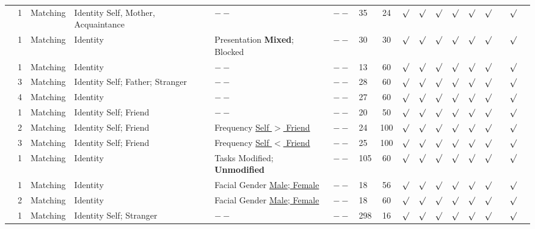 \documentclass[sn-apa]{sn-jnl}%
\theoremstyle{thmstyleone}%
\theoremstyle{thmstyletwo}%
\theoremstyle{thmstylethree}%
\begin{document}
\begin{table}
\begin{tabular*}{\textwidth}{@{\extracolsep\fill}lp{0.5cm}p{1cm}p{1cm}p{1cm}cp{1cm}cccccccccc}
		\textcite{schafer2019understanding} & 1 & Matching & Identity Self, Mother, Acquaintance\centering & $--$\centering & $--$ & 35 & 24 & $\surd$ & $\surd$ & $\surd$ & $\surd$  & $\surd$ & $\surd$ & & $\surd$ \\
		\textcite{golubickis2021judging} & 1 & Matching & Identity\centering & Presentation \textbf{Mixed}; Blocked\centering & $--$ & 30 & 30 & $\surd$ & $\surd$ & $\surd$ & $\surd$  & $\surd$ & $\surd$ & & $\surd$ \\
		 \textcite{navon2021are} & 1 & Matching & Identity\centering & $--$\centering & $--$ & 13 & 60 & $\surd$ & $\surd$ & $\surd$ & $\surd$  & $\surd$ & $\surd$ & & $\surd$ \\
		 & 3 & Matching & Identity Self; Father; Stranger\centering & $--$\centering & $--$ & 28 & 60 & $\surd$ & $\surd$ & $\surd$ & $\surd$  & $\surd$ & $\surd$ & & $\surd$ \\
		& 4 & Matching & Identity\centering & $--$\centering & $--$ & 27 & 60 & $\surd$ & $\surd$ & $\surd$ & $\surd$  & $\surd$ & $\surd$ & & $\surd$ \\
		\textcite{svensson2022more} & 1 & Matching & Identity Self; Friend\centering & $--$\centering & $--$ & 20 & 50 & $\surd$ & $\surd$ & $\surd$ & $\surd$  & $\surd$ & $\surd$ & & $\surd$ \\
		& 2 & Matching & Identity Self; Friend\centering & Frequency \underline{Self $>$ Friend}\centering  & $--$ & 24 & 100 & $\surd$ & $\surd$ & $\surd$ & $\surd$  & $\surd$ & $\surd$ & & $\surd$ \\
		& 3 & Matching & Identity Self; Friend\centering & Frequency \underline{Self $<$ Friend}\centering & $--$ & 25 & 100 & $\surd$ & $\surd$ & $\surd$ & $\surd$  & $\surd$ & $\surd$ & & $\surd$ \\
		\textcite{xu2021romantic} & 1 & Matching & Identity\centering & Tasks Modified; \textbf{Unmodified}\centering & $--$ & 105 & 60 & $\surd$ & $\surd$ & $\surd$ & $\surd$  & $\surd$ & $\surd$ & & $\surd$ \\ 
		\textcite{wozniak2018prioritization} & 1 & Matching & Identity\centering & Facial Gender \underline{Male; Female}\centering & $--$ & 18 & 56 & $\surd$ & $\surd$ & $\surd$ & $\surd$  & $\surd$ & $\surd$ & & $\surd$ \\
		& 2 & Matching & Identity\centering & Facial Gender \underline{Male; Female}\centering & $--$ & 18 & 60 & $\surd$ & $\surd$ & $\surd$ & $\surd$  & $\surd$ & $\surd$ & & $\surd$ \\  
		\textcite{liu2023to} & 1 & Matching & Identity Self; Stranger\centering & $--$\centering & $--$ & 298 & 16 & $\surd$ & $\surd$ & $\surd$ & $\surd$  & $\surd$ & $\surd$ & & $\surd$ \\

\end{tabular*}
\end{table}
\end{document}
